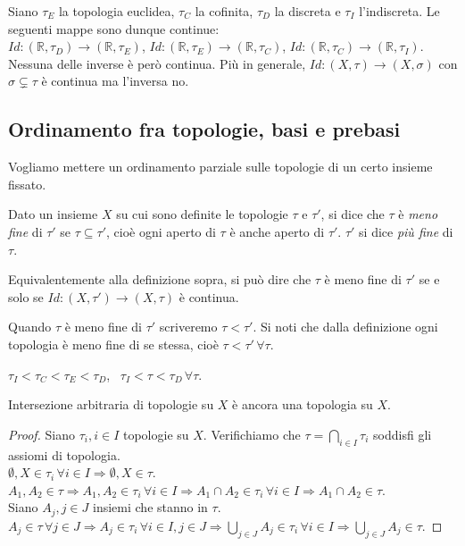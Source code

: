 \documentclass{article}
\begin{document}
\begin{ex}
	Siano $\tau_E$ la topologia euclidea, $\tau_C$ la cofinita, $\tau_D$ la discreta e $\tau_I$ l'indiscreta. Le seguenti mappe sono dunque continue: \\
	$Id:(\mathbb{R}, \tau_D) \rightarrow (\mathbb{R}, \tau_E)$, $Id:(\mathbb{R}, \tau_E) \rightarrow (\mathbb{R}, \tau_C)$, $Id:(\mathbb{R}, \tau_C) \rightarrow (\mathbb{R}, \tau_I)$. Nessuna delle inverse è però continua. Più in generale, $Id: (X, \tau) \rightarrow (X, \sigma)$ con $\sigma \subsetneq \tau$ è continua ma l'inversa no.
\end{ex}

\subsection{Ordinamento fra topologie, basi e prebasi}

Vogliamo mettere un ordinamento parziale sulle topologie di un certo insieme fissato.

\begin{defn}
Dato un insieme $X$ su cui sono definite le topologie $\tau$ e $\tau'$, si dice che $\tau$ \`e \textit{meno fine} di $\tau'$ se $\tau \subseteq \tau'$, cioè ogni aperto di $\tau$ è anche aperto di $\tau'$. $\tau'$ si dice \textit{più fine} di $\tau$.
\end{defn}

\begin{oss}
Equivalentemente alla definizione sopra, si pu\`o dire che $\tau$ \`e meno fine di $\tau'$ se e solo se ${Id:(X,\tau')\rightarrow(X, \tau)}$ \`e continua.
\end{oss}

Quando $\tau$ è meno fine di $\tau'$ scriveremo $\tau < \tau'$. Si noti che dalla definizione ogni topologia è meno fine di se stessa, cioè $\tau < \tau' \, \forall \tau$.

\begin{ex}
	$\tau_I < \tau_C < \tau_E < \tau_D$, \, $\tau_I < \tau < \tau_D \, \forall \tau$.
\end{ex}

\begin{lm}
	Intersezione arbitraria di topologie su $X$ è ancora una topologia su $X$.
\end{lm}

\begin{proof}
	Siano $\tau_i, i \in I$ topologie su $X$. Verifichiamo che $\displaystyle \tau=\bigcap_{i \in I} \tau_i$ soddisfi gli assiomi di topologia. \\
	$\emptyset, X \in \tau_i \, \forall i \in I \Rightarrow \emptyset, X \in \tau$. \\
	$A_1, A_2 \in \tau \Rightarrow A_1, A_2 \in \tau_i \, \forall i \in I \Rightarrow A_1 \cap A_2 \in \tau_i \, \forall i \in I \Rightarrow A_1 \cap A_2 \in \tau$. \\
	Siano $A_j, j \in J$ insiemi che stanno in $\tau$. \\
	$\displaystyle A_j \in \tau \, \forall j \in J \Rightarrow A_j \in \tau_i \, \forall i \in I, j \in J \Rightarrow \bigcup_{j \in J} A_j \in \tau_i \, \forall i \in I \Rightarrow \bigcup_{j \in J} A_j \in \tau$.
\end{proof}
\end{document}

